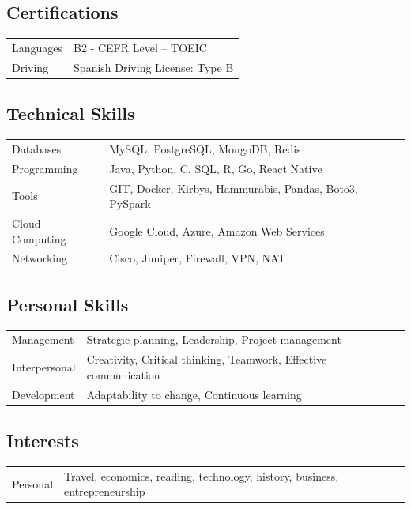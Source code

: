\documentclass[a4paper,10pt]{article}
\begin{document}
	\subsection*{Certifications}
	\begin{tabularx}{\linewidth}{@{}l X@{}}
		Languages & B2 - CEFR Level – TOEIC \\
		Driving & Spanish Driving License: Type B \\
	\end{tabularx}
	
	\subsection*{Technical Skills}
	\begin{tabularx}{\linewidth}{@{}l X@{}}
		Databases & MySQL, PostgreSQL, MongoDB, Redis \\
		Programming & Java, Python, C, SQL, R, Go, React Native \\
		Tools & GIT, Docker, Kirbys, Hammurabis, Pandas, Boto3, PySpark \\
		Cloud Computing & Google Cloud, Azure, Amazon Web Services \\
		Networking & Cisco, Juniper, Firewall, VPN, NAT \\
	\end{tabularx}
	
	\subsection*{Personal Skills}
	\begin{tabularx}{\linewidth}{@{}l X@{}}
		Management & Strategic planning, Leadership, Project management \\
		Interpersonal & Creativity, Critical thinking, Teamwork, Effective communication \\
		Development & Adaptability to change, Continuous learning \\
	\end{tabularx}
	
	\subsection*{Interests}
	\begin{tabularx}{\linewidth}{@{}l X@{}}
		Personal & Travel, economics, reading, technology, history, business, entrepreneurship \\
	\end{tabularx}
	
	\vfill
	
\end{document}
